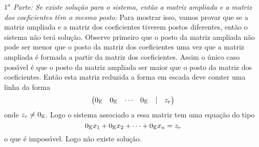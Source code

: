 \begin{prova}
	\textit{$1^a$ Parte: Se existe solu\c{c}\~ao para o sistema, ent\~ao a matriz ampliada e a matriz dos coeficientes t\^em o mesmo posto:} Para mostrar isso, vamos provar que se a matriz ampliada e a matriz dos coeficientes tiverem postos diferentes, ent\~ao o sistema n\~ao ter\'a solu\c{c}\~ao. Observe primeiro que o posto da matriz ampliada n\~ao pode ser menor que o posto da matriz dos coeficientes uma vez que a matriz ampliada \'e formada a partir da matriz dos coeficientes. Assim o \'unico caso poss{\'\i}vel \'e que o posto da matriz ampliada ser maior que o posto da matriz dos coeficientes. Ent\~ao esta matriz reduzida a forma em escada deve comter uma linha da forma
	\[
	\begin{pmatrix}
		0_{\mathbb{K}} & 0_{\mathbb{K}} & \cdots & 0_{\mathbb{K}} & \mid & z_r
	\end{pmatrix}
	\]
	onde $z_r \ne 0_{\mathbb{K}}$.
	Logo o sistema associado a essa matriz tem uma equa\c{c}\~ao do tipo
	\[
		0_{\mathbb{K}}x_1 + 0_{\mathbb{K}}x_2 + \cdots + 0_{\mathbb{K}}x_n = z_r
	\]
	o que \'e imposs{\'\i}vel. Logo n\~ao existe solu\c{c}\~ao.


\end{prova}
